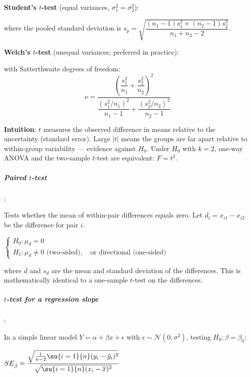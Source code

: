 \textbf{Student's $t$-test} (equal variances, $\sigma_1^2 = \sigma_2^2$):
\begin{center}
\end{center}
where the pooled standard deviation is
$s_p = \sqrt{\dfrac{(n_1-1)s_1^2+(n_2-1)s_2^2}{n_1+n_2-2}}$.

\textbf{Welch's $t$-test} (unequal variances; preferred in practice):
\begin{center}
\end{center}
with Satterthwaite degrees of freedom:
$$\nu = \dfrac{\left(\dfrac{s_1^2}{n_1}+\dfrac{s_2^2}{n_2}\right)^{\!2}}%
{\dfrac{(s_1^2/n_1)^2}{n_1-1}+\dfrac{(s_2^2/n_2)^2}{n_2-1}}$$

\textbf{Intuition}: $t$ measures the observed difference in means relative to the
uncertainty (standard error). Large $|t|$ means the groups are far apart relative to
within-group variability — evidence against $H_0$. Under $H_0$ with $k=2$, one-way
ANOVA and the two-sample $t$-test are equivalent: $F = t^2$.

\subparagraph{Paired $t$-test}:

Tests whether the mean of within-pair differences equals zero. Let
$d_i = x_{i1} - x_{i2}$ be the difference for pair $i$.

$\begin{cases}
    H_0: \mu_d = 0 \\
    H_1: \mu_d \neq 0 \text{ (two-sided)}, \quad \text{or directional (one-sided)}
\end{cases}$

\begin{center}
\end{center}

where $\overline{d}$ and $s_d$ are the mean and standard deviation of the differences.
This is mathematically identical to a one-sample $t$-test on the differences.

\subparagraph{$t$-test for a regression slope}:

In a simple linear model $Y = \alpha + \beta x + \epsilon$ with
$\epsilon \sim \mathcal{N}(0, \sigma^2)$, testing $H_0: \beta = \beta_0$:
\begin{center}
\qquad
$SE_{\hat{\beta}} = \dfrac{\sqrt{\frac{1}{n-2}\su{i=1}{n}(y_i-\hat{y}_i)^2}}%
{\sqrt{\su{i=1}{n}(x_i-\overline{x})^2}}$
\end{center}

